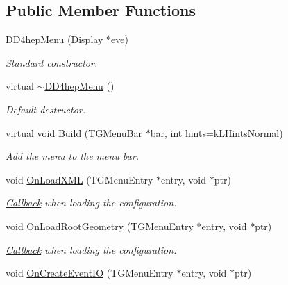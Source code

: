 \subsection*{Public Member Functions}
\begin{DoxyCompactItemize}
\item 
\hyperlink{class_d_d4hep_1_1_d_d4hep_menu_a3d62c983630ad5f2d7f31fbe8c3d3e3e}{DD4hepMenu} (\hyperlink{class_d_d4hep_1_1_display}{Display} $\ast$eve)
\begin{DoxyCompactList}\small\item\em Standard constructor. \item\end{DoxyCompactList}\item 
virtual \hyperlink{class_d_d4hep_1_1_d_d4hep_menu_ab6c197b60017a053af2d1d41e63574f2}{$\sim$DD4hepMenu} ()
\begin{DoxyCompactList}\small\item\em Default destructor. \item\end{DoxyCompactList}\item 
virtual void \hyperlink{class_d_d4hep_1_1_d_d4hep_menu_a85d08c3fd89b740586c592797e780607}{Build} (TGMenuBar $\ast$bar, int hints=kLHintsNormal)
\begin{DoxyCompactList}\small\item\em Add the menu to the menu bar. \item\end{DoxyCompactList}\item 
void \hyperlink{class_d_d4hep_1_1_d_d4hep_menu_a3bb55c2f200a4575cf4bddd720efd5ab}{OnLoadXML} (TGMenuEntry $\ast$entry, void $\ast$ptr)
\begin{DoxyCompactList}\small\item\em \hyperlink{class_d_d4hep_1_1_callback}{Callback} when loading the configuration. \item\end{DoxyCompactList}\item 
void \hyperlink{class_d_d4hep_1_1_d_d4hep_menu_a4bc97ab3803f51bf9d271dd88781d6be}{OnLoadRootGeometry} (TGMenuEntry $\ast$entry, void $\ast$ptr)
\begin{DoxyCompactList}\small\item\em \hyperlink{class_d_d4hep_1_1_callback}{Callback} when loading the configuration. \item\end{DoxyCompactList}\item 
void \hyperlink{class_d_d4hep_1_1_d_d4hep_menu_a560b5e3a05e4d3ef571fa876ac1dcdd2}{OnCreateEventIO} (TGMenuEntry $\ast$entry, void $\ast$ptr)

\end{DoxyCompactItemize}
